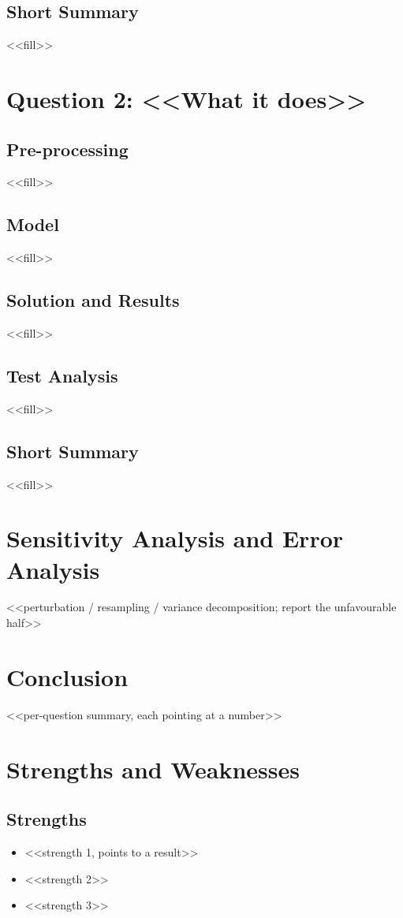 \documentclass[<<options>>]{apmcmthesis}
\begin{document}
\subsection{Short Summary}
<<fill>>
\section{Question 2: <<What it does>>}
\subsection{Pre-processing}
<<fill>>
\subsection{Model}
<<fill>>
\subsection{Solution and Results}
<<fill>>
\subsection{Test Analysis}
<<fill>>
\subsection{Short Summary}
<<fill>>
\section{Sensitivity Analysis and Error Analysis}
<<perturbation / resampling / variance decomposition; report the unfavourable half>>
\section{Conclusion}
<<per-question summary, each pointing at a number>>
\section{Strengths and Weaknesses}
\subsection{Strengths}
\begin{itemize}
  \item <<strength 1, points to a result>>
  \item <<strength 2>>
  \item <<strength 3>>
\end{itemize}
\end{document}
